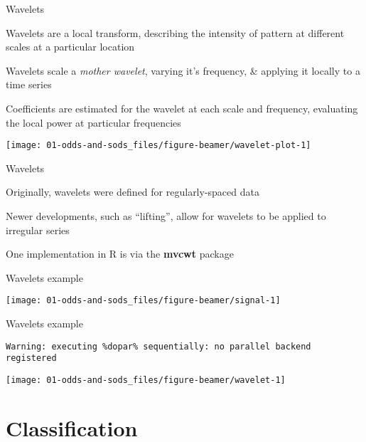 \documentclass[11pt,ignorenonframetext,compress, aspectratio=169]{beamer}
\begin{document}
\begin{frame}{Wavelets}

Wavelets are a local transform, describing the intensity of pattern at
different scales at a particular location

Wavelets scale a \emph{mother wavelet}, varying it's frequency, \&
applying it locally to a time series

Coefficients are estimated for the wavelet at each scale and frequency,
evaluating the local power at particular frequencies

\begin{center}\texttt{[image: 01-odds-and-sods\_files/figure-beamer/wavelet-plot-1]} \end{center}

\end{frame}

\begin{frame}{Wavelets}

Originally, wavelets were defined for regularly-spaced data

Newer developments, such as ``lifting'', allow for wavelets to be
applied to irregular series

One implementation in R is via the \textbf{mvcwt} package

\end{frame}

\begin{frame}{Wavelets example}

\begin{center}\texttt{[image: 01-odds-and-sods\_files/figure-beamer/signal-1]} \end{center}

\end{frame}

\begin{frame}[fragile]{Wavelets example}

\begin{verbatim}
Warning: executing %dopar% sequentially: no parallel backend registered
\end{verbatim}

\begin{center}\texttt{[image: 01-odds-and-sods\_files/figure-beamer/wavelet-1]} \end{center}

\end{frame}

\section{Classification}\label{classification}
\end{document}
